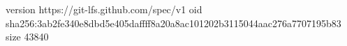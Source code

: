 version https://git-lfs.github.com/spec/v1
oid sha256:3ab2fe340e8dbd5e405daffff8a20a8ac101202b3115044aac276a7707195b83
size 43840
